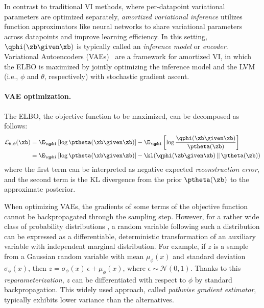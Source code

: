 In contrast to traditional VI methods, where per-datapoint variational parameters are optimized separately, \emph{amortized variational inference} utilizes function approximators like neural networks to share variational parameters across data\-points and improve learning efficiency. In this setting, $\qphi (\zb \given \xb)$ is typically called an \emph{inference model} or \emph{encoder}.
%
Variational Autoencoders (VAEs)~\cite{kingma2013auto,rezende2014stochastic} are a framework for amortized VI, in which the ELBO is maximized by jointly optimizing the inference model and the LVM (i.e., $\phi$ and $\theta$, respectively) with stochastic gradient ascent.

\paragraph{VAE optimization.}
The ELBO, the objective function to be maximized, can be decomposed as follows:
%
\begin{align}
    \mathcal{L}_{\theta,\phi} (\xb) 
    &= \E_{\qphi}  \left[ \log \ptheta(\xb \given \zb) \right] - \E_{\qphi}  \left[ \log \frac{\qphi(\zb \given \xb)}{\ptheta(\zb)} \right] \label{eq:elbo} \\
    &= \E_{\qphi}  \left[ \log \ptheta(\xb \given \zb) \right] - \kl(\qphi(\zb \given \xb) \,||\, \ptheta(\zb)) \nonumber
\end{align}
%
where the first term can be interpreted as negative expected \emph{reconstruction error}, and the second term is the KL divergence from the prior $\ptheta(\zb)$ to the approximate posterior.

When optimizing VAEs, the gradients of some terms of the objective function cannot be backpropagated through the sampling step.
However, for a rather wide class of probability distributions \cite{kingma2013auto}, a random variable following such a distribution can be expressed as a differentiable, deterministic transformation of an auxiliary variable with independent marginal distribution. 
For example, if $z$ is a sample from a Gaussian random variable with mean $\mu_\phi(x)$ and standard deviation $\sigma_\phi(x)$, then $z = \sigma_\phi(x)\, \epsilon + \mu_\phi(x)$, where $\epsilon \sim \mathcal{N}(0,1)$. Thanks to this \emph{reparameterization}, $z$ can be differentiated with respect to $\phi$ by standard backpropagation.
This widely used approach, called \emph{pathwise gradient estimator}, typically exhibits lower variance than the alternatives.

